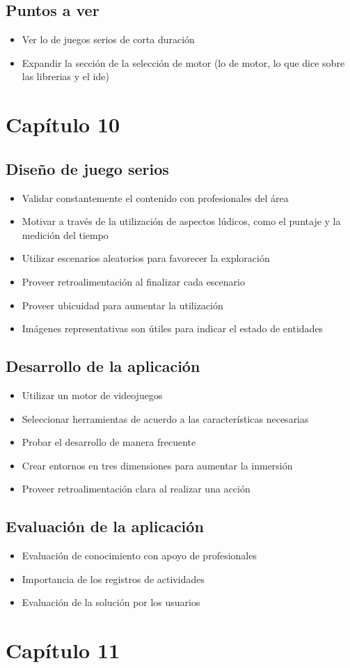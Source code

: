 \subsection{Puntos a ver}

\begin{itemize}
\item Ver lo de juegos serios de corta duración
\item Expandir la sección de la selección de motor (lo de motor, lo que dice
    sobre las librerias y el \gls{ide})
\end{itemize}

\section{Capítulo 10}

\subsection{Diseño de juego serios}

\begin{itemize}
\item Validar constantemente el contenido con profesionales del área
\item Motivar a través de la utilización de aspectos lúdicos, como el puntaje y la medición del tiempo
\item Utilizar escenarios aleatorios para favorecer la exploración
\item Proveer retroalimentación al finalizar cada escenario
\item Proveer ubicuidad para aumentar la utilización
\item Imágenes representativas son útiles para indicar el estado de entidades
\end{itemize}

\subsection{Desarrollo de la aplicación}

\begin{itemize}
\item Utilizar un motor de videojuegos
\item Seleccionar herramientas de acuerdo a las características necesarias
\item Probar el desarrollo de manera frecuente
\item Crear entornos en tres dimensiones para aumentar la inmersión
\item Proveer retroalimentación clara al realizar una acción
\end{itemize}

\subsection{Evaluación de la aplicación}

\begin{itemize}
\item Evaluación de conocimiento con apoyo de profesionales
\item Importancia de los registros de actividades
\item Evaluación de la solución por los usuarios
\end{itemize}

\section{Capítulo 11}
